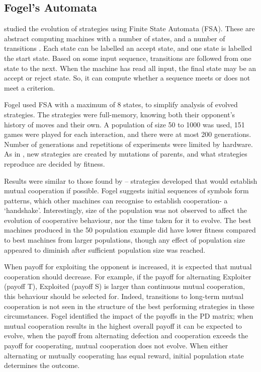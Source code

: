 \documentclass[a4paper,11pt,bcshonoursthesis,singlespace,oneside,thesisdraft,pdflatex]{cssethesis}
\begin{document}
\subsection{Fogel's Automata}
\citet{fogel1993evolving} studied the evolution of strategies using Finite State Automata (FSA). 
These are abstract computing machines with a number of states, and a number of transitions \citep{Sipser2006}. 
Each state can be labelled an accept state, and one state is labelled the start state. 
Based on some input sequence, transitions are followed from one state to the next. 
When the machine has read all input, the final state may be an accept or reject state. 
So, it can compute whether a sequence meets or does not meet a criterion. 

Fogel used FSA with a maximum of 8 states, to simplify analysis of evolved strategies. The strategies were full-memory, knowing both their opponent's history of moves and their own. 
A population of size 50 to 1000 was used, 151 games were played for each interaction, and there were at most 200 generations. 
Number of generations and repetitions of experiments were limited by hardware. As in \citet{axelrod1987evolution}, new strategies are created by mutations of parents, and what strategies reproduce are decided by fitness. 

Results were similar to those found by \citep{Axelrod1997} -- strategies developed that would establish mutual cooperation if possible. Fogel suggests initial sequences of symbols form patterns, which other machines can recognise to establish cooperation- a `handshake'. 
Interestingly, size of the population was not observed to affect the evolution of cooperative behaviour, nor the time taken for it to evolve. The best machines produced in the 50 population example did have lower fitness compared to best machines from larger populations, though any effect of population size appeared to diminish after sufficient population size was reached. 

When payoff for exploiting the opponent is increased, it is expected that mutual cooperation should decrease. For example, if the payoff for alternating Exploiter (payoff T), Exploited (payoff S) is larger than continuous mutual cooperation, this behaviour should be selected for. Indeed, transitions to long-term mutual cooperation is not seen in the structure of the best performing strategies in these circumstances. Fogel identified the impact of the payoffs in the PD matrix; when mutual cooperation results in the highest overall payoff it can be expected to evolve, when the payoff from alternating defection and cooperation exceeds the payoff for cooperating, mutual cooperation does not evolve. When either alternating or mutually cooperating has equal reward, initial population state determines the outcome. 
\end{document}
